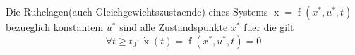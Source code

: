 Die Ruhelagen(auch Gleichgewichtszustaende) eines Systems $\operatorname{x} = \operatorname{f}(x^*, u^*,t)$ bezueglich konstantem $u^*$ sind alle Zustandspunkte $x^*$ fuer die gilt
$$\forall t \geq t_0 :\dot{\operatorname{x}}(t) = \operatorname{f}(x^*, u^*, t) = 0$$
